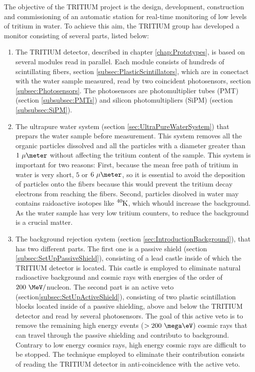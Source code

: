 The objective of the TRITIUM project is the design, development, construction and commissioning of an automatic station for real-time monitoring of low levels of tritium in water. To achieve this aim, the TRITIUM group has developed a monitor consisting of several parts, listed below: 

\begin{enumerate}

\item{} The TRITIUM detector, described in chapter \ref{chap:Prototypes}, is based on several modules read in parallel. Each module consists of hundreds of scintillating fibers, section \ref{subsec:PlasticScintillators}, which are in conectact with the water sample measured, read by two coincident photosensors, section \ref{subsec:Photosensors}. The photosensors are photomultiplier tubes (PMT) (section \ref{subsubsec:PMTs}) and silicon photomultipliers (SiPM) (section \ref{subsubsec:SiPM}).

\item{} The ultrapure water system (section \ref{sec:UltraPureWaterSystem}) that prepars the water sample before measurement. This system removes all the organic particles dissolved and all the particles with a diameter greater than $1~\mu\meter$ without affecting the tritium content of the sample. This system is important for two reasons: First, because the mean free path of tritium in water is very short, $5$ or $6~\mu\meter$,  so it is essential to avoid the deposition of particles onto the fibers because this would prevent the tritium decay electrons from reaching the fibers. Second, particles disolved in water may contains raidoactive isotopes like $\ce{^{40}K}$, which whould increase the background. As the water sample has very low tritium counters, to reduce the background is a crucial matter.

\item{} The background rejection system (section \ref{sec:IntroductionBackground}), that has two different parts. The first one is a passive shield (section \ref{subsec:SetUpPassiveShield}), consisting of a lead castle inside of which the TRITIUM detector is located. This castle is employed to eliminate natural radioactive background and cosmic rays with energies of the order of $200~\MeV/$nucleon. The second part is an active veto (section\ref{subsec:SetUpActiveShield}), consisting of two plastic scintillation blocks located inside of a passive shielding, above and below the TRITIUM detector and read by several photosensors. The goal of this active veto is to remove the remaining high energy events ($>200~\mega\eV$) cosmic rays that can travel through the passive shielding and contributo to background. Contrary to low energy cosmics rays, high energy cosmic rays are difficult to be stopped. The technique employed to eliminate their contribution consists of reading the TRITIUM detector in anti-coincidence with the active veto.


\end{enumerate}
